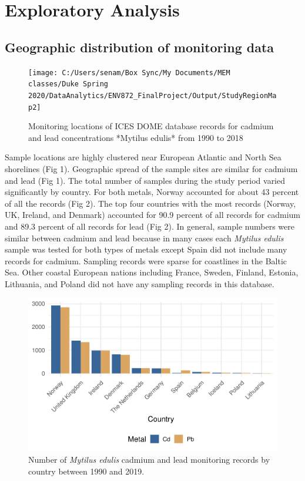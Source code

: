 \documentclass[
  12pt,
]{article}
\begin{document}
\newpage

\hypertarget{exploratory-analysis}{%
\section{Exploratory Analysis}\label{exploratory-analysis}}

\hypertarget{geographic-distribution-of-monitoring-data}{%
\subsection{Geographic distribution of monitoring
data}\label{geographic-distribution-of-monitoring-data}}

\begin{figure}
\texttt{[image: C:/Users/senam/Box Sync/My Documents/MEM classes/Duke Spring 2020/DataAnalytics/ENV872\_FinalProject/Output/StudyRegionMap2]} \caption{Monitoring locations of ICES DOME database records for cadmium and lead concentrations *Mytilus edulis* from 1990 to 2018}\label{fig:unnamed-chunk-1}
\end{figure}

Sample locations are highly clustered near European Atlantic and North
Sea shorelines (Fig 1). Geographic spread of the sample sites are
similar for cadmium and lead (Fig 1). The total number of samples during
the study period varied significantly by country. For both metals,
Norway accounted for about 43 percent of all the records (Fig 2). The
top four countries with the most records (Norway, UK, Ireland, and
Denmark) accounted for 90.9 percent of all records for cadmium and 89.3
percent of all records for lead (Fig 2). In general, sample numbers were
similar between cadmium and lead because in many cases each
\emph{Mytilus edulis} sample was tested for both types of metals except
Spain did not include many records for cadmium. Sampling records were
sparse for coastlines in the Baltic Sea. Other coastal European nations
including France, Sweden, Finland, Estonia, Lithuania, and Poland did
not have any sampling records in this database.

\begin{figure}
\centering
\includegraphics{McCrory_ENV972_Project_files/figure-latex/unnamed-chunk-2-1.pdf}
\caption{Number of \emph{Mytilus edulis} cadmium and lead monitoring
records by country between 1990 and 2019.}
\end{figure}
\end{document}
